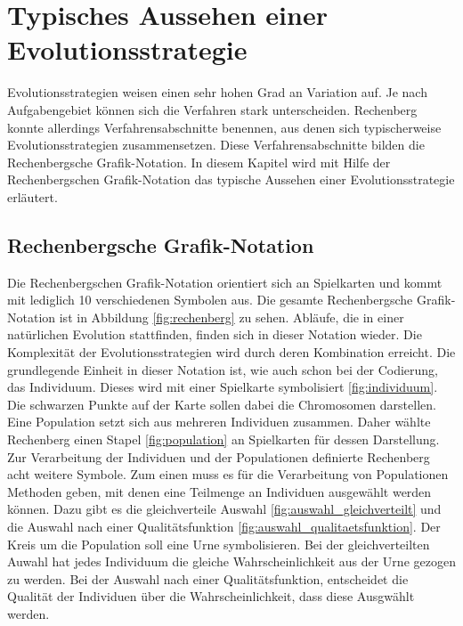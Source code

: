 \section{Typisches Aussehen einer Evolutionsstrategie}
Evolutionsstrategien weisen einen sehr hohen Grad an Variation auf. Je nach Aufgabengebiet können sich die Verfahren stark unterscheiden.
Rechenberg konnte allerdings Verfahrensabschnitte benennen, aus denen sich typischerweise Evolutionsstrategien zusammensetzen.
Diese Verfahrensabschnitte bilden die Rechenbergsche Grafik-Notation. In diesem Kapitel wird mit Hilfe der Rechenbergschen Grafik-Notation das typische Aussehen einer Evolutionsstrategie erläutert.

\subsection{Rechenbergsche Grafik-Notation}
Die  Rechenbergschen Grafik-Notation orientiert sich an Spielkarten und kommt mit lediglich 10 verschiedenen Symbolen aus.
Die gesamte Rechenbergsche Grafik-Notation ist in Abbildung \ref{fig:rechenberg} zu sehen. Abläufe, die in einer natürlichen Evolution stattfinden, finden sich in dieser Notation wieder.
Die Komplexität der Evolutionsstrategien wird durch deren Kombination erreicht.
Die grundlegende Einheit in dieser Notation ist, wie auch schon bei der Codierung, das Individuum. Dieses wird mit einer Spielkarte symbolisiert \ref{fig:individuum}. Die schwarzen Punkte auf der Karte sollen dabei die Chromosomen darstellen.
Eine Population setzt sich aus mehreren Individuen zusammen. Daher wählte Rechenberg einen Stapel \ref{fig:population} an Spielkarten für dessen Darstellung. Zur Verarbeitung der Individuen und der Populationen definierte Rechenberg acht weitere Symbole.
Zum einen muss es für die Verarbeitung von Populationen Methoden geben, mit denen eine Teilmenge an Individuen ausgewählt werden können. Dazu gibt es die gleichverteile Auswahl \ref{fig:auswahl_gleichverteilt} und die Auswahl nach einer Qualitätsfunktion \ref{fig:auswahl_qualitaetsfunktion}.
Der Kreis um die Population soll eine Urne symbolisieren. Bei der gleichverteilten Auwahl hat jedes Individuum die gleiche Wahrscheinlichkeit aus der Urne gezogen zu werden. Bei der Auswahl nach einer Qualitätsfunktion, entscheidet die Qualität der Individuen über die Wahrscheinlichkeit, dass diese Ausgwählt werden.
